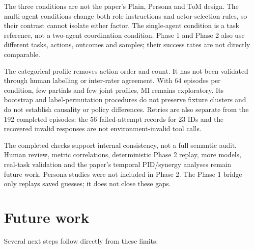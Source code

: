 \documentclass[12pt,a4paper,oneside]{report}
\begin{document}
The three conditions are not the paper’s Plain, Persona and ToM design. The multi-agent conditions change both role instructions and actor-selection rules, so their contrast cannot isolate either factor. The single-agent condition is a task reference, not a two-agent coordination condition. Phase 1 and Phase 2 also use different tasks, actions, outcomes and samples; their success rates are not directly comparable.

The categorical profile removes action order and count. It has not been validated through human labelling or inter-rater agreement. With 64 episodes per condition, few partials and few joint profiles, MI remains exploratory. Its bootstrap and label-permutation procedures do not preserve fixture clusters and do not establish causality or policy differences. Retries are also separate from the 192 completed episodes: the 56 failed-attempt records for 23 IDs and the recovered invalid responses are not environment-invalid tool calls.

The completed checks support internal consistency, not a full semantic audit. Human review, metric correlations, deterministic Phase 2 replay, more models, real-task validation and the paper’s temporal PID/synergy analyses remain future work. Persona studies were not included in Phase 2. The Phase 1 bridge only replays saved guesses; it does not close these gaps.

\section{Future work}
Several next steps follow directly from these limits:
\end{document}
